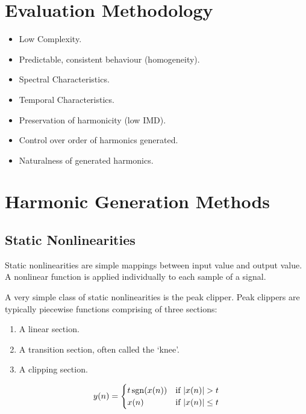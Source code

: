 \section{Evaluation Methodology}
\label{sec:Excitation-Evaluation}
	\note
	{
		\begin{itemize}
			\item Low Complexity.
			\item Predictable, consistent behaviour (homogeneity).
			\item Spectral Characteristics.
			\item Temporal Characteristics.
			\item Preservation of harmonicity (low IMD).
			\item Control over order of harmonics generated.
			\item Naturalness of generated harmonics.
		\end{itemize}
	}

\section{Harmonic Generation Methods}
\label{sec:Excitation-Methods}

	\subsection{Static Nonlinearities}
	\label{sec:Excitation-Statics}
		Static nonlinearities are simple mappings between input value and output value. A nonlinear function is
		applied individually to each sample of a signal. 
		
		A very simple class of static nonlinearities is the peak clipper. Peak clippers are typically piecewise
		functions comprising of three sections:

		\begin{enumerate}
			\item A linear section.
			\item A transition section, often called the `knee'.
			\item A clipping section.
		\end{enumerate}

		\begin{equation}
			y(n) = \begin{cases}
				t\operatorname{sgn}(x(n)) & \text{if $|x(n)| > t$} \\
				x(n) & \text{if $|x(n)| \leq t$}
			\end{cases}
			\label{eq:SymmetricHardClipping}
		\end{equation}

